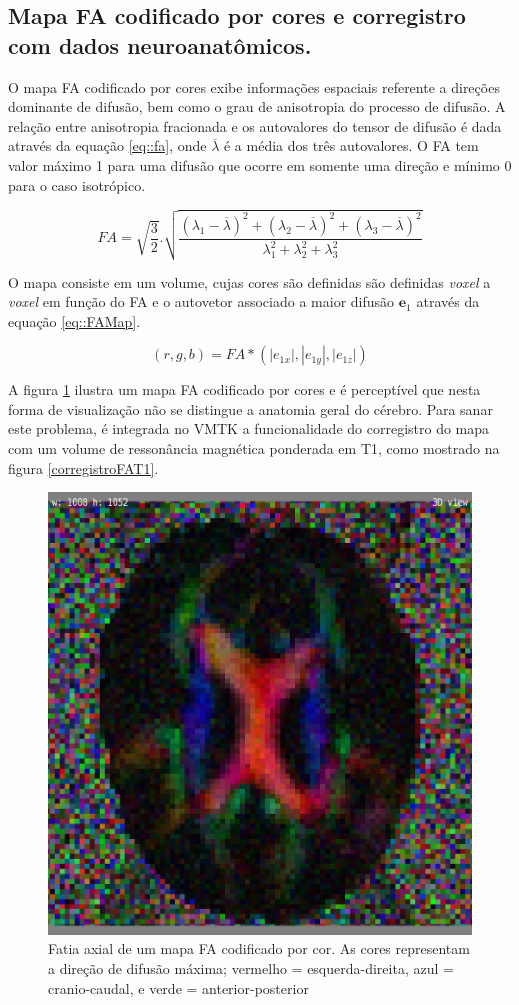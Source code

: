 \documentclass[
    12pt,                %
    oneside,            %
    a4paper,            %
    english,            %
    french,                %
    spanish,            %
    brazil                %
    ]{abntex2}
\begin{document}
\subsection{Mapa FA codificado por cores e corregistro com dados neuroanatômicos.}



O mapa FA codificado por cores exibe informações espaciais referente a direções dominante de difusão, bem como o grau de anisotropia do processo de difusão.
A relação entre anisotropia fracionada e os autovalores do tensor de difusão é dada através da equação \ref{eq::fa}, onde $\overline{\lambda}$ é a média dos três autovalores. O FA tem valor máximo 1 para uma difusão que ocorre em somente uma direção e mínimo 0 para o caso isotrópico.

\begin{equation}
\label{eq::fa}
    FA = \sqrt{\frac{3}{2}}.\sqrt{\frac{(\lambda_1 - \overline{\lambda})^2 + (\lambda_2 - \overline{\lambda})^2 + (\lambda_3 - \overline{\lambda})^2}{\lambda_1^2 + \lambda_2^2 + \lambda_3^2}}
\end{equation}


O mapa consiste em um volume, cujas cores são definidas são definidas \textit{voxel} a \textit{voxel} em função do FA e o autovetor associado a maior difusão $\mathbf{e}_1$ através da equação \ref{eq::FAMap}.

\begin{equation}
\label{eq::FAMap}
    (r,g,b) = FA*(|e_{1x}|,|e_{1y}|,|e_{1z}|)
\end{equation}

A figura \ref{fig::MapaFA} ilustra um mapa FA codificado por cores e é perceptível que nesta forma de visualização não se distingue a anatomia geral do cérebro. Para sanar este problema, é integrada no VMTK a funcionalidade do corregistro do mapa com um volume de ressonância magnética ponderada em T1, como mostrado na figura \ref{corregistroFAT1}.

\begin{figure}[H]

    \centering

    \includegraphics[width=0.45\linewidth, angle=0]{figs/Exemplo_Trabalhos_Relacionados/MapaFA.png}
    \caption{Fatia axial de um mapa FA codificado por cor. As cores representam a direção de difusão máxima; vermelho = esquerda-direita, azul = cranio-caudal, e verde = anterior-posterior}
    \label{fig::MapaFA}
\end{figure}
\end{document}
